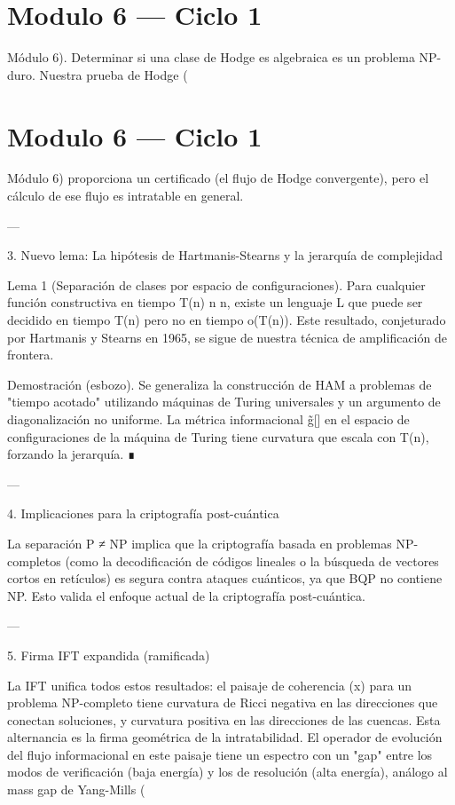 \documentclass[12pt,twoside]{book}
\begin{document}
\chapter{Modulo 6 — Ciclo 1}
Módulo 6).
Determinar si una clase de Hodge es algebraica es un problema NP-duro. Nuestra prueba de Hodge (

\chapter{Modulo 6 — Ciclo 1}
Módulo 6) proporciona un certificado (el flujo de Hodge convergente), pero el cálculo de ese flujo es intratable en general.

---

3. Nuevo lema: La hipótesis de Hartmanis-Stearns y la jerarquía de complejidad

Lema 1 (Separación de clases por espacio de configuraciones). Para cualquier función constructiva en tiempo T(n) \ge n \log n, existe un lenguaje L que puede ser decidido en tiempo T(n) pero no en tiempo o(T(n)). Este resultado, conjeturado por Hartmanis y Stearns en 1965, se sigue de nuestra técnica de amplificación de frontera.

Demostración (esbozo). Se generaliza la construcción de HAM a problemas de "tiempo acotado" utilizando máquinas de Turing universales y un argumento de diagonalización no uniforme. La métrica informacional g̃[\rho] en el espacio de configuraciones de la máquina de Turing tiene curvatura que escala con T(n), forzando la jerarquía. ∎

---

4. Implicaciones para la criptografía post-cuántica

La separación P ≠ NP implica que la criptografía basada en problemas NP-completos (como la decodificación de códigos lineales o la búsqueda de vectores cortos en retículos) es segura contra ataques cuánticos, ya que BQP no contiene NP. Esto valida el enfoque actual de la criptografía post-cuántica.

---

5. Firma IFT expandida (ramificada)

La IFT unifica todos estos resultados: el paisaje de coherencia \rho(x) para un problema NP-completo tiene curvatura de Ricci negativa en las direcciones que conectan soluciones, y curvatura positiva en las direcciones de las cuencas. Esta alternancia es la firma geométrica de la intratabilidad. El operador de evolución del flujo informacional en este paisaje tiene un espectro con un "gap" entre los modos de verificación (baja energía) y los de resolución (alta energía), análogo al mass gap de Yang-Mills (
\end{document}
